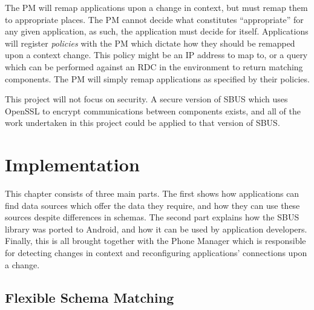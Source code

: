 \documentclass[12pt,twoside,notitlepage]{report}
\begin{document}
The PM will remap applications upon a change in context, but must remap them to appropriate places. 
The PM cannot decide what constitutes ``appropriate'' for any given application, as such, the application must decide for itself. 
Applications will register {\sl policies} with the PM which dictate how they should be remapped upon a context change. 
This policy might be an IP address to map to, or a query which can be performed against an RDC in the environment to return matching components. 
The PM will simply remap applications as specified by their policies.

This project will not focus on security. 
A secure version of SBUS which uses OpenSSL to encrypt communications between components exists, and all of the work undertaken in this project could be applied to that version of SBUS.

\cleardoublepage


\chapter{Implementation}

This chapter consists of three main parts. 
The first shows how applications can find data sources which offer the data they require, and how they can use these sources despite differences in schemas. 
The second part explains how the SBUS library was ported to Android, and how it can be used by application developers. 
Finally, this is all brought together with the Phone Manager which is responsible for detecting changes in context and reconfiguring applications' connections upon a change.

\section{Flexible Schema Matching}
\end{document}
